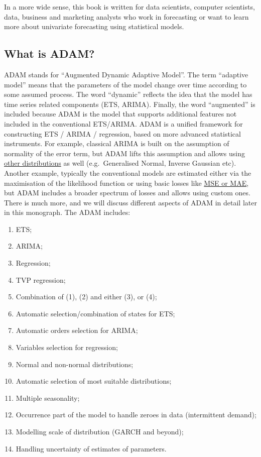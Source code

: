 \documentclass[
]{book}
\providecommand{\tightlist}{%
  \setlength{\itemsep}{0pt}\setlength{\parskip}{0pt}}
\theoremstyle{definition}
\theoremstyle{definition}
\theoremstyle{definition}
\theoremstyle{definition}
\theoremstyle{remark}
\begin{document}
In a more wide sense, this book is written for data scientists, computer scientists, data, business and marketing analysts who work in forecasting or want to learn more about univariate forecasting using statistical models.

\hypertarget{what-is-adam}{%
\subsection*{What is ADAM?}\label{what-is-adam}}

ADAM stands for ``Augmented Dynamic Adaptive Model''. The term ``adaptive model'' means that the parameters of the model change over time according to some assumed process. The word ``dynamic'' reflects the idea that the model has time series related components (ETS, ARIMA). Finally, the word ``augmented'' is included because ADAM is the model that supports additional features not included in the conventional ETS/ARIMA. ADAM is a unified framework for constructing ETS / ARIMA / regression, based on more advanced statistical instruments. For example, classical ARIMA is built on the assumption of normality of the error term, but ADAM lifts this assumption and allows using \protect\hyperlink{distributions}{other distributions} as well (e.g.~Generalised Normal, Inverse Gaussian etc). Another example, typically the conventional models are estimated either via the maximisation of the likelihood function or using basic losses like \protect\hyperlink{errorMeasures}{MSE or MAE}, but ADAM includes a broader spectrum of losses and allows using custom ones. There is much more, and we will discuss different aspects of ADAM in detail later in this monograph. The ADAM includes:

\begin{enumerate}
\def\labelenumi{\arabic{enumi}.}
\tightlist
\item
  ETS;
\item
  ARIMA;
\item
  Regression;
\item
  TVP regression;
\item
  Combination of (1), (2) and either (3), or (4);
\item
  Automatic selection/combination of states for ETS;
\item
  Automatic orders selection for ARIMA;
\item
  Variables selection for regression;
\item
  Normal and non-normal distributions;
\item
  Automatic selection of most suitable distributions;
\item
  Multiple seasonality;
\item
  Occurrence part of the model to handle zeroes in data (intermittent demand);
\item
  Modelling scale of distribution (GARCH and beyond);
\item
  Handling uncertainty of estimates of parameters.
\end{enumerate}
\end{document}

